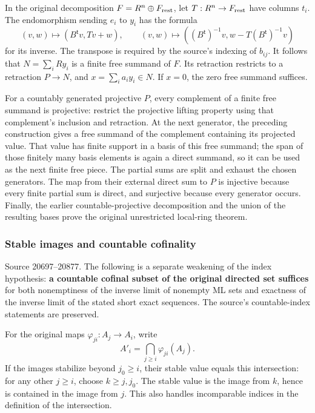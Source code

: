 In the original decomposition \(F=R^n\oplus F_{\rm rest}\), let \(T:R^n\to F_{\rm rest}\) have columns \(t_i\). The endomorphism sending \(e_i\) to \(y_i\) has the formula \[
(v,w)\longmapsto(B^{\mathsf t}v,Tv+w),
\qquad
(v,w)\longmapsto((B^{\mathsf t})^{-1}v,w-T(B^{\mathsf t})^{-1}v)
\] for its inverse. The transpose is required by the source's indexing of \(b_{ij}\). It follows that \(N=\sum_i Ry_i\) is a finite free summand of \(F\). Its retraction restricts to a retraction \(P\to N\), and \(x=\sum_i a_i y_i\in N\). If \(x=0\), the zero free summand suffices.

For a countably generated projective \(P\), every complement of a finite free summand is projective: restrict the projective lifting property using that complement's inclusion and retraction. At the next generator, the preceding construction gives a free summand of the complement containing its projected value. That value has finite support in a basis of this free summand; the span of those finitely many basis elements is again a direct summand, so it can be used as the next finite free piece. The partial sums are split and exhaust the chosen generators. The map from their external direct sum to \(P\) is injective because every finite partial sum is direct, and surjective because every generator occurs. Finally, the earlier countable-projective decomposition and the union of the resulting bases prove the original unrestricted local-ring theorem.

\subsubsection{Stable images and countable cofinality}\label{stable-images-and-countable-cofinality}

Source 20697--20877. The following is a separate weakening of the index hypothesis: \textbf{a countable cofinal subset of the original directed set suffices} for both nonemptiness of the inverse limit of nonempty ML sets and exactness of the inverse limit of the stated short exact sequences. The source's countable-index statements are preserved.

For the original maps \(\varphi_{ji}:A_j\to A_i\), write \[
A'_i=\bigcap_{j\geq i}\varphi_{ji}(A_j).
\] If the images stabilize beyond \(j_0\geq i\), their stable value equals this intersection: for any other \(j\geq i\), choose \(k\geq j,j_0\). The stable value is the image from \(k\), hence is contained in the image from \(j\). This also handles incomparable indices in the definition of the intersection.

